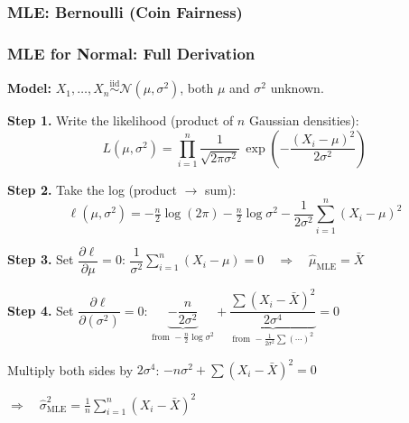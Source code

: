 \documentclass[aspectratio=169]{beamer}
\begin{document}
\begin{frame}
\frametitle{MLE: Bernoulli (Coin Fairness)}
\begin{center}
\end{center}
\end{frame}

\begin{frame}
\frametitle{MLE for Normal: Full Derivation}

\small
\textbf{Model:} $X_1, \ldots, X_n \overset{\text{iid}}{\sim} \mathcal{N}(\mu, \sigma^2)$, \;both $\mu$ and $\sigma^2$ unknown.

\vspace{0.1cm}
\textbf{Step 1.}\; Write the likelihood (product of $n$ Gaussian densities):
\vspace{-0.1cm}
$$L(\mu, \sigma^2) = \prod_{i=1}^n \frac{1}{\sqrt{2\pi\sigma^2}}\,\exp\!\!\left(-\frac{(X_i - \mu)^2}{2\sigma^2}\right)$$

\vspace{-0.3cm}\pause
\textbf{Step 2.}\; Take the log (product $\to$ sum):
\vspace{-0.15cm}
$$\ell(\mu, \sigma^2) = -\tfrac{n}{2}\log(2\pi) - \tfrac{n}{2}\log\sigma^2 - \frac{1}{2\sigma^2}\sum_{i=1}^n(X_i - \mu)^2$$

\vspace{-0.3cm}\pause
\textbf{Step 3.}\; Set $\dfrac{\partial\ell}{\partial\mu} = 0$: \quad $\dfrac{1}{\sigma^2}\displaystyle\sum_{i=1}^n(X_i - \mu) = 0 \quad\Longrightarrow\quad \boxed{\hat\mu_{\text{MLE}} = \bar{X}}$

\vspace{0.1cm}\pause
\textbf{Step 4.}\; Set $\dfrac{\partial\ell}{\partial(\sigma^2)} = 0$: \quad
$\underbrace{-\dfrac{n}{2\sigma^2}}_{\text{from }-\frac{n}{2}\log\sigma^2} + \underbrace{\dfrac{\sum(X_i - \bar{X})^2}{2\sigma^4}}_{\text{from }-\frac{1}{2\sigma^2}\sum(\cdots)^2} = 0$

\vspace{0.05cm}
\hfill Multiply both sides by $2\sigma^4$: \;$-n\sigma^2 + \sum(X_i - \bar{X})^2 = 0$\hspace{2.0cm}\null

\vspace{0.05cm}
\hfill$\Longrightarrow\quad \boxed{\hat\sigma^2_{\text{MLE}} = \frac{1}{n}\sum_{i=1}^n(X_i - \bar{X})^2}$\hspace{1.5cm}\null
\end{frame}
\end{document}
